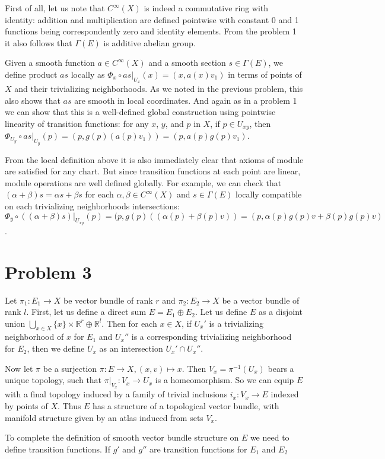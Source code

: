 \documentclass{article}[14pt]
\begin{document}
First of all, let us note that $C^\infty (X)$ is indeed a commutative ring with  \\ identity:
addition and multiplication are defined pointwise with constant 0 and 1 functions being correspondently
zero and identity elements. From the problem 1 it also follows that $\Gamma (E)$ is additive 
abelian group.

Given a smooth function $a \in C^\infty (X)$ and a smooth section $s \in \Gamma (E)$,
we define product $as$ locally as $\Phi_x \circ as |_{U_x} (x) = (x, a(x) v_1)$
in terms of points of $X$ and their trivializing neighborhoods.
As we noted in the previous problem, this also shows that $as$ are smooth in local coordinates.
And again as in a problem 1 we can show that this is a well-defined global construction using pointwise
linearity of transition functions: for any $x$, $y$, and $p$ in $X$, if $p \in U_{xy}$,
then $\Phi_{U_y} \circ as |_{U_y} (p) = (p, g(p)(a(p)v_1)) = (p, a(p)g(p)v_1)$.

From the local definition above it is also immediately clear that axioms of module are
satisfied for any chart. But since transition functions at each point are linear, module
operations are well defined globally. For example, we can check that $(\alpha + \beta)s = \alpha s + \beta s$
for each $\alpha, \beta \in C^\infty (X)$ and $s \in \Gamma (E)$ locally compatible on 
each trivializing neighborhoods intersections: 
$\Phi_y \circ ((\alpha + \beta) s) |_{U_{xy}} (p) = (p, g(p)((\alpha(p) + \beta(p) v)) = (p, \alpha(p)g(p)v + \beta(p)g(p)v)$.

\section{Problem 3}

Let $\pi_1: E_1 \rightarrow X$ be vector bundle of rank $r$ and 
$\pi_2: E_2 \rightarrow X$ be a vector bundle of rank $l$.
First, let us define a direct sum $E = E_1 \oplus E_2$.
Let us define $E$ as a disjoint union $\bigcup_{x \in X} \{ x \} \times \mathbb R^r \oplus \mathbb R^l$.
Then for each $x \in X$, if $U_x'$ is a trivializing neighborhood of $x$ for $E_1$
and $U_x''$ is a corresponding trivializing neighborhood for $E_2$,
then we define $U_x$ as an intersection $U_x' \cap U_x''$.

Now let $\pi$ be a surjection $\pi: E \rightarrow X, (x, v) \mapsto x$.
Then $V_x = \pi^{-1} (U_x)$ bears a unique topology, such that $\pi |_{V_x}: V_x \rightarrow U_x$
is a homeomorphism. So we can equip $E$ with a final topology induced by a family
of trivial inclusions $i_x: V_x \rightarrow E$ indexed by points of $X$. Thus $E$ has
a structure of a topological vector bundle, with manifold structure given by an atlas
induced from sets $V_x$.

To complete the definition of smooth vector bundle structure on $E$ we need to define
transition functions. If $g'$ and $g''$ are transition functions for $E_1$ and $E_2$ 
\end{document}

